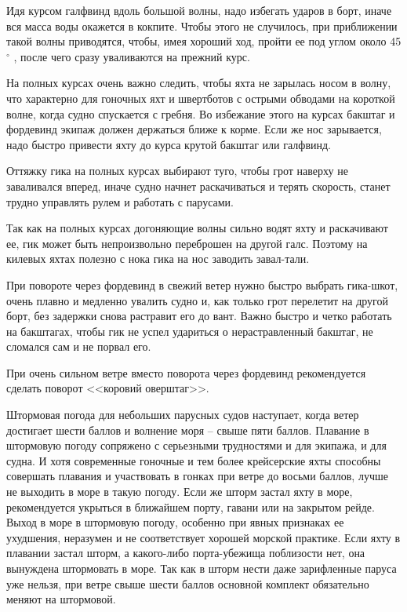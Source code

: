 \documentclass[a4paper, 12pt, twoside, final]{scrbook}
\begin{document}
Идя курсом галфвинд вдоль большой волны, надо избегать ударов в борт, иначе вся масса воды окажется в кокпите. Чтобы этого не случилось, при приближении такой волны приводятся, чтобы, имея хороший ход, пройти ее под углом около 45$^\circ$ , после чего сразу уваливаются на прежний курс.

На полных курсах очень важно следить, чтобы яхта не зарылась носом в волну, что характерно для гоночных яхт и швертботов с острыми обводами на короткой волне, когда судно спускается с гребня. Во избежание этого на курсах бакштаг и фордевинд экипаж должен держаться ближе к корме. Если же нос зарывается, надо быстро привести яхту до курса крутой бакштаг или галфвинд.

Оттяжку гика на полных курсах выбирают туго, чтобы грот наверху не заваливался вперед, иначе судно начнет раскачиваться и терять скорость, станет трудно управлять рулем и работать с парусами.

Так как на полных курсах догоняющие волны сильно водят яхту и раскачивают ее, гик может быть непроизвольно переброшен на другой галс. Поэтому на килевых яхтах полезно с нока гика на нос заводить завал-тали.

При повороте через фордевинд в свежий ветер нужно быстро выбрать гика-шкот, очень плавно и медленно увалить судно и, как только грот перелетит на другой борт, без задержки снова растравит его до вант. Важно быстро и четко работать на бакштагах, чтобы гик не успел удариться о нерастравленный бакштаг, не сломался сам и не порвал его.

При очень сильном ветре вместо поворота через фордевинд рекомендуется сделать поворот <<коровий оверштаг>>.

Штормовая погода для небольших парусных судов наступает, когда ветер достигает шести баллов и волнение моря \--- свыше пяти баллов. Плавание в штормовую погоду сопряжено с серьезными трудностями и для экипажа, и для судна. И хотя современные гоночные и тем более крейсерские яхты способны совершать плавания и участвовать в гонках при ветре до восьми баллов, лучше не выходить в море в такую погоду. Если же шторм застал яхту в море, рекомендуется укрыться в ближайшем порту, гавани или на закрытом рейде. Выход в море в штормовую погоду, особенно при явных признаках ее ухудшения, неразумен и не соответствует хорошей морской практике.
Если яхту в плавании застал шторм, а какого-либо порта-убежища поблизости нет, она вынуждена штормовать в море. Так как в шторм нести даже зарифленные паруса уже нельзя, при ветре свыше шести баллов основной комплект обязательно меняют на штормовой.
\end{document}
